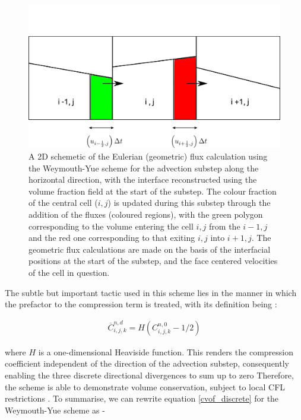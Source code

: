 \begin{figure}[!h]
\includegraphics[width=1.0\textwidth]{plots/methodology/wy.png} 
\caption{ A 2D schemetic of the Eulerian (geometric) flux calculation  
using the Weymouth-Yue \cite{wy} scheme for the advection substep
along the horizontal direction, with the interface reconstructed 
using the volume fraction field at the start of the substep.
The colour fraction of the central cell ($i,j$) is updated during this substep
through the addition of the fluxes (coloured regions), with the green polygon corresponding
to the volume entering the cell $i,j$ from the $i-1,j$ and the red one corresponding to
that exiting $i,j$ into $i+1,j$. The geometric flux calculations are made on the basis
of the interfacial positions at the start of the substep, and the face centered velocities 
of the cell in question.}
\label{fig:wy}
\end{figure}

The subtle but important tactic used in this scheme lies in the manner in which the 
prefactor to the compression term   is treated, with its definition being : 

\begin{align}
\overline{C}_{i,j,k}^{n,d} = H \left( C_{i,j,k}^{n,0} - 1/2 \right)
\label{wy_cond}
\end{align}

where $H$ is a one-dimensional Heaviside function. This renders the compression coefficient 
independent of the direction of the advection substep, consequently enabling the 
three discrete directional divergences to sum up to zero 
Therefore, the scheme is able to demonstrate volume conservation, subject to local 
CFL restrictions . To summarise, we can rewrite equation \ref{cvof_discrete}
for the Weymouth-Yue scheme as - 

